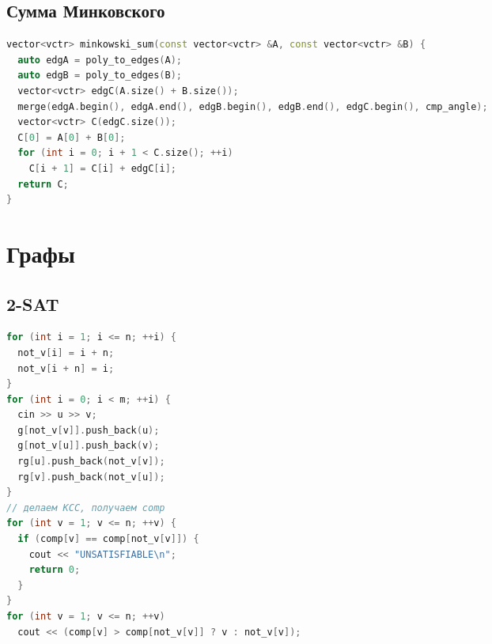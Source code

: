 \documentclass[10pt,a4paper,landscape,twosided]{extarticle}
\begin{document}
\begin{multicols*}{3}
\begin{lstlisting}[language=C++]
\end{lstlisting}

\subsection{Сумма Минковского}
\begin{lstlisting}[language=C++]
vector<vctr> minkowski_sum(const vector<vctr> &A, const vector<vctr> &B) {
  auto edgA = poly_to_edges(A);
  auto edgB = poly_to_edges(B);
  vector<vctr> edgC(A.size() + B.size());
  merge(edgA.begin(), edgA.end(), edgB.begin(), edgB.end(), edgC.begin(), cmp_angle);
  vector<vctr> C(edgC.size());
  C[0] = A[0] + B[0];
  for (int i = 0; i + 1 < C.size(); ++i)
    C[i + 1] = C[i] + edgC[i];
  return C;
}

\end{lstlisting}

\section{Графы}

\subsection{2-SAT}
\begin{lstlisting}[language=C++]
for (int i = 1; i <= n; ++i) {
  not_v[i] = i + n;
  not_v[i + n] = i;
}
for (int i = 0; i < m; ++i) {
  cin >> u >> v;
  g[not_v[v]].push_back(u);
  g[not_v[u]].push_back(v);
  rg[u].push_back(not_v[v]);
  rg[v].push_back(not_v[u]);
}
// делаем КСС, получаем comp
for (int v = 1; v <= n; ++v) {
  if (comp[v] == comp[not_v[v]]) {
    cout << "UNSATISFIABLE\n";
    return 0;
  }
}
for (int v = 1; v <= n; ++v)
  cout << (comp[v] > comp[not_v[v]] ? v : not_v[v]);
\end{lstlisting}


\end{multicols*}
\end{document}
